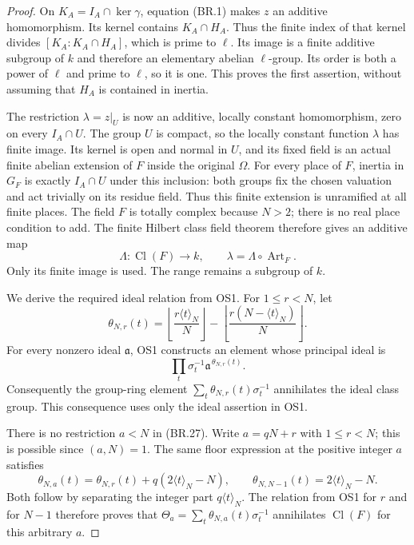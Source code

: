 \begin{proof}
On $K_A=I_A\cap\ker\gamma$, equation (BR.1) makes $z$ an
additive homomorphism.  Its kernel contains $K_A\cap H_A$.
Thus the finite index of that kernel divides
$[K_A:K_A\cap H_A]$, which is prime to $\ell$.
Its image is a finite additive subgroup of $k$ and therefore an
elementary abelian $\ell$-group.  Its order is both a power of
$\ell$ and prime to $\ell$, so it is one.  This proves the first
assertion, without assuming that $H_A$ is contained in inertia.

The restriction $\lambda=z|_U$ is now an additive, locally constant
homomorphism, zero on every $I_A\cap U$.  The group $U$ is compact,
so the locally constant function $\lambda$ has finite image.
Its kernel is open and normal in $U$, and its fixed field is an
actual finite abelian extension of $F$ inside the original $\Omega$.
For every place of $F$, inertia in $G_F$ is exactly
$I_A\cap U$ under this inclusion: both groups fix the chosen
valuation and act trivially on its residue field.
Thus this finite extension is unramified at all finite places.
The field $F$ is totally complex because $N>2$; there is no real
place condition to add.  The finite Hilbert class field theorem
therefore gives an additive map
\[
       \Lambda:\operatorname{Cl}(F)\longrightarrow k,\qquad
       \lambda=\Lambda\circ\operatorname{Art}_F.
       \tag{BR.28}
\]
Only its finite image is used.  The range remains a subgroup of $k$.

We derive the required ideal relation from OS1.
For $1\le r<N$, let
\[
 \theta_{N,r}(t)=
    \left\lfloor\frac{r\langle t\rangle_N}{N}\right\rfloor
    -\left\lfloor\frac{r(N-\langle t\rangle_N)}{N}\right\rfloor.
 \tag{BR.29}
\]
For every nonzero ideal $\mathfrak a$, OS1 constructs an element
whose principal ideal is
\[
                       \prod_t
                 \sigma_t^{-1}\mathfrak a^{\,\theta_{N,r}(t)}.
\]
Consequently the group-ring element
$\sum_t\theta_{N,r}(t)\sigma_t^{-1}$
annihilates the ideal class group.
This consequence uses only the ideal assertion in OS1.

There is no restriction $a<N$ in (BR.27).
Write $a=qN+r$ with $1\le r<N$; this is possible since $(a,N)=1$.
The same floor expression at the positive integer $a$ satisfies
\[
 \theta_{N,a}(t)=\theta_{N,r}(t)+q(2\langle t\rangle_N-N),
 \qquad
 \theta_{N,N-1}(t)=2\langle t\rangle_N-N.
 \tag{BR.30}
\]
Both follow by separating the integer part $q\langle t\rangle_N$.
The relation from OS1 for $r$ and for $N-1$ therefore proves
that $\Theta_a=\sum_t\theta_{N,a}(t)\sigma_t^{-1}$
annihilates $\operatorname{Cl}(F)$ for this arbitrary $a$.


\end{proof}
